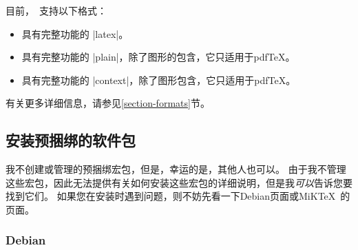 
目前，\pgfname\ 支持以下格式：
%
\begin{itemize}
    \item 具有完整功能的 |latex|。
    \item 具有完整功能的 |plain|，除了图形的包含，它只适用于pdf\TeX。
    \item 具有完整功能的 |context|，除了图形包含，它只适用于pdf\TeX。
\end{itemize}


有关更多详细信息，请参见\ref{section-formats}节。


\subsection{安装预捆绑的软件包}


我不创建或管理\pgfname 的预捆绑宏包，但是，幸运的是，其他人也可以。 由于我不管理这些宏包，因此无法提供有关如何安装这些宏包的详细说明，但是我\emph{可以}告诉您要找到它们。 如果您在安装时遇到问题，则不妨先看一下Debian页面或MiK\TeX\ 的页面。


\subsubsection{Debian}


